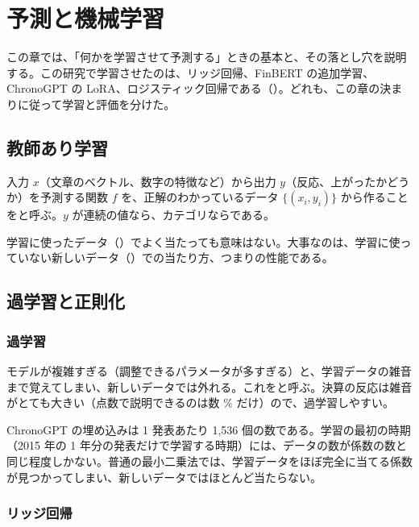 \chapter{予測と機械学習}\label{ch:ml}

この章では、「何かを学習させて予測する」ときの基本と、その落とし穴を説明する。この研究で学習させたのは、リッジ回帰、FinBERT の追加学習、ChronoGPT の LoRA、ロジスティック回帰である（）。どれも、この章の決まりに従って学習と評価を分けた。

\section{教師あり学習}

入力 $x$（文章のベクトル、数字の特徴など）から出力 $y$（反応、上がったかどうか）を予測する関数 $f$ を、正解のわかっているデータ $\{(x_i,y_i)\}$ から作ることをと呼ぶ。$y$ が連続の値なら、カテゴリならである。

学習に使ったデータ（）でよく当たっても意味はない。大事なのは、学習に使っていない新しいデータ（）での当たり方、つまりの性能である。

\section{過学習と正則化}

\subsection{過学習}

モデルが複雑すぎる（調整できるパラメータが多すぎる）と、学習データの雑音まで覚えてしまい、新しいデータでは外れる。これをと呼ぶ。決算の反応は雑音がとても大きい（点数で説明できるのは数 \% だけ）ので、過学習しやすい。

\begin{exbox}
ChronoGPT の埋め込みは 1 発表あたり 1,536 個の数である。学習の最初の時期（2015 年の 1 年分の発表だけで学習する時期）には、データの数が係数の数と同じ程度しかない。普通の最小二乗法では、学習データをほぼ完全に当てる係数が見つかってしまい、新しいデータではほとんど当たらない。
\end{exbox}

\subsection{リッジ回帰}

